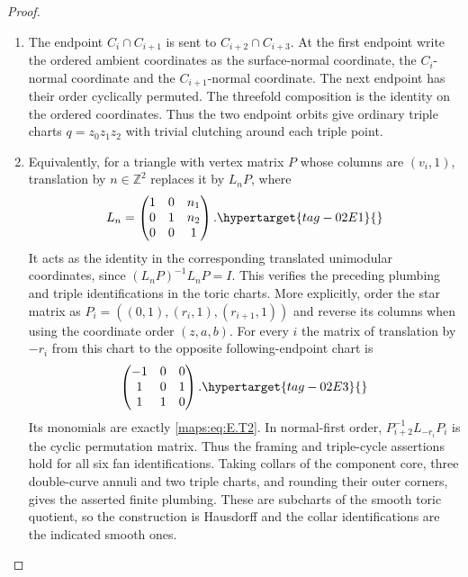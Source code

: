\documentclass[11pt,a4paper]{article}
\numberwithin{equation}{section}
\theoremstyle{definition}
\begin{document}
\begin{proof}
\begin{enumerate}[label=\arabic*.,leftmargin=*]
\item The endpoint $C_i\cap C_{i+1}$ is sent to
$C_{i+2}\cap C_{i+3}$.  At the first endpoint write the
ordered ambient coordinates as the surface-normal coordinate,
the $C_i$-normal coordinate and the $C_{i+1}$-normal coordinate.
The next endpoint has their order cyclically permuted.
The threefold composition is the identity on the ordered coordinates.  Thus the two endpoint orbits give
ordinary triple charts $q=z_0z_1z_2$ with trivial clutching around each triple point.

\item Equivalently, for a triangle with vertex matrix $P$ whose
columns are $(v_i,1)$, translation by $n\in\mathbb Z^2$
replaces it by $L_nP$, where
\begin{equation}
 L_n=\begin{pmatrix}1&0&n_1\\0&1&n_2\\0&0&1\end{pmatrix}.
 \hypertarget{tag-02E1}{}\label{maps:eq:E.T7}
\end{equation}
It acts as the identity in the corresponding translated
unimodular coordinates, since
$(L_nP)^{-1}L_nP=I$.  This verifies the preceding plumbing
and triple identifications in the toric charts.
More explicitly, order the star matrix as
$P_i=((0,1),(r_i,1),(r_{i+1},1))$ and reverse its
columns when using the coordinate order $(z,a,b)$.
For every $i$ the matrix of translation by $-r_i$ from
this chart to the opposite following-endpoint chart is
\begin{equation}
 \begin{pmatrix}-1&0&0\\1&0&1\\1&1&0\end{pmatrix}.
 \hypertarget{tag-02E3}{}\label{maps:eq:E.T9}
\end{equation}
Its monomials are exactly \eqref{maps:eq:E.T2}.  In normal-first order,
$P_{i+2}^{-1}L_{-r_i}P_i$ is the cyclic permutation
matrix.  Thus the framing and triple-cycle assertions hold for all six fan identifications.
Taking collars of the component core, three double-curve
annuli and two triple charts, and rounding their outer
corners, gives the asserted finite plumbing.  These are
subcharts of the smooth toric quotient, so the construction
is Hausdorff and the collar identifications are the indicated
smooth ones.


\end{enumerate}
\end{proof}
\end{document}
